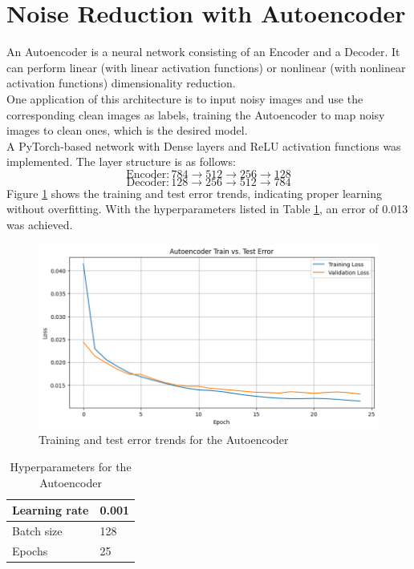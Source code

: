 \documentclass[12pt]{article}
\renewcommand{\ae}{Autoencoder}
\begin{document}
	\section{Noise Reduction with \ae}\label{sec: ae}
	An Autoencoder is a neural network consisting of an Encoder and a Decoder. It can perform linear (with linear activation functions) or nonlinear (with nonlinear activation functions) dimensionality reduction.\\
	One application of this architecture is to input noisy images and use the corresponding clean images as labels, training the Autoencoder to map noisy images to clean ones, which is the desired model.\\
	A PyTorch-based network with Dense layers and ReLU activation functions was implemented. The layer structure is as follows:
	\[
	\text{Encoder}: 784 \rightarrow 512 \rightarrow 256 \rightarrow 128
	\]
	\[
	\text{Decoder}: 128 \rightarrow 256 \rightarrow 512 \rightarrow 784
	\]
	Figure \ref{fig: ae train test error} shows the training and test error trends, indicating proper learning without overfitting. With the hyperparameters listed in Table \ref{tbl: ae hyparam}, an error of 0.013 was achieved.
	\begin{figure}[H]
		\centering
		\includegraphics[scale=0.6]{figs/train test error ae}
		\caption{Training and test error trends for the Autoencoder}
		\label{fig: ae train test error}
	\end{figure}
	\begin{table}[H]
		\centering
		\begin{tabularx}{\linewidth}{|X|X|}
			\toprule
			Learning rate & 0.001 \\
			\midrule
			Batch size & 128 \\
			\midrule
			Epochs & 25 \\
			\bottomrule
		\end{tabularx}
		\caption{Hyperparameters for the Autoencoder}
		\label{tbl: ae hyparam}
	\end{table}
\end{document}
